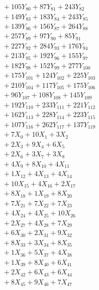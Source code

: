 \documentclass[a4paper,10pt]{article}
\begin{document}
{\begin{align}
&\;  + 105 Y_{80} + 87 Y_{81} + 243 Y_{82} \\[0.3ex]
&\;  + 149 Y_{83} + 183 Y_{84} + 243 Y_{85} \\[0.3ex]
&\;  + 139 Y_{86} + 156 Y_{87} + 264 Y_{88} \\[0.5ex]\allowbreak
&\;  + 257 Y_{89} + 97 Y_{90} + 85 Y_{91} \\[0.3ex]
&\;  + 227 Y_{92} + 284 Y_{93} + 176 Y_{94} \\[0.3ex]
&\;  + 213 Y_{95} + 192 Y_{96} + 155 Y_{97} \\[0.3ex]
&\;  + 182 Y_{98} + 152 Y_{99} + 277 Y_{100} \\[0.3ex]
&\;  + 175 Y_{101} + 124 Y_{102} + 225 Y_{103} \\[0.3ex]
&\;  + 210 Y_{104} + 117 Y_{105} + 175 Y_{106} \\[0.3ex]
&\;  + 96 Y_{107} + 108 Y_{108} + 145 Y_{109} \\[0.3ex]
&\;  + 192 Y_{110} + 233 Y_{111} + 221 Y_{112} \\[0.3ex]
&\;  + 162 Y_{113} + 228 Y_{114} + 223 Y_{115} \\[0.3ex]
&\;  + 107 Y_{116} + 262 Y_{117} + 137 Y_{119} \\[0.5ex]\allowbreak
&\;  + 7 X_{0} + 10 X_{1} + 3 X_{2} \\[0.3ex]
&\;  + 2 X_{3} + 9 X_{4} + 6 X_{5} \\[0.3ex]
&\;  + 2 X_{6} + 3 X_{7} + 3 X_{8} \\[0.3ex]
&\;  + 4 X_{9} + 8 X_{10} + 4 X_{11} \\[0.3ex]
&\;  + 1 X_{12} + 4 X_{13} + 4 X_{14} \\[0.3ex]
&\;  + 10 X_{15} + 4 X_{16} + 2 X_{17} \\[0.3ex]
&\;  + 8 X_{18} + 1 X_{19} + 8 X_{20} \\[0.3ex]
&\;  + 7 X_{21} + 7 X_{22} + 7 X_{23} \\[0.3ex]
&\;  + 4 X_{24} + 4 X_{25} + 10 X_{26} \\[0.3ex]
&\;  + 2 X_{27} + 4 X_{28} + 7 X_{29} \\[0.5ex]\allowbreak
&\;  + 6 X_{30} + 2 X_{31} + 9 X_{32} \\[0.3ex]
&\;  + 8 X_{33} + 3 X_{34} + 8 X_{35} \\[0.3ex]
&\;  + 1 X_{36} + 5 X_{37} + 4 X_{38} \\[0.3ex]
&\;  + 1 X_{39} + 8 X_{40} + 6 X_{41} \\[0.3ex]
&\;  + 2 X_{42} + 6 X_{43} + 6 X_{44} \\[0.3ex]
&\;  + 8 X_{45} + 9 X_{46} + 7 X_{47} \\[0.3ex]

\end{align}}
\end{document}

